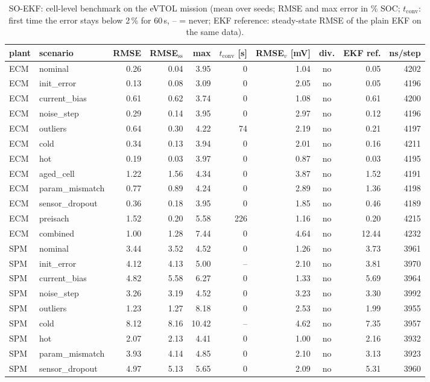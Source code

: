 \begin{table}[H]\centering\footnotesize\setlength{\tabcolsep}{4pt}
\caption{SO-EKF: cell-level benchmark on the eVTOL mission (mean over seeds; RMSE and max error in \% SOC; $t_\mathrm{conv}$: first time the error stays below 2\,\% for 60\,s, -- = never; EKF reference: steady-state RMSE of the plain EKF on the same data).}\label{tab:cell_SOEKF}
\begin{tabular}{llrrrrrcrr}\toprule
plant & scenario & RMSE & RMSE$_\mathrm{ss}$ & max & $t_\mathrm{conv}$ [s] & RMSE$_v$ [mV] & div. & EKF ref. & ns/step \\ \midrule
ECM & nominal & 0.26 & 0.04 & 3.95 & 0 & 1.04 & no & 0.05 & 4202 \\
ECM & init\_error & 0.13 & 0.08 & 3.09 & 0 & 2.05 & no & 0.05 & 4196 \\
ECM & current\_bias & 0.61 & 0.62 & 3.74 & 0 & 1.08 & no & 0.61 & 4200 \\
ECM & noise\_step & 0.29 & 0.14 & 3.95 & 0 & 2.97 & no & 0.12 & 4196 \\
ECM & outliers & 0.64 & 0.30 & 4.22 & 74 & 2.19 & no & 0.21 & 4197 \\
ECM & cold & 0.34 & 0.13 & 3.94 & 0 & 2.01 & no & 0.16 & 4211 \\
ECM & hot & 0.19 & 0.03 & 3.97 & 0 & 0.87 & no & 0.03 & 4195 \\
ECM & aged\_cell & 1.22 & 1.56 & 4.34 & 0 & 3.87 & no & 1.52 & 4191 \\
ECM & param\_mismatch & 0.77 & 0.89 & 4.24 & 0 & 2.89 & no & 1.36 & 4198 \\
ECM & sensor\_dropout & 0.36 & 0.18 & 3.95 & 0 & 1.85 & no & 0.46 & 4189 \\
ECM & preisach & 1.52 & 0.20 & 5.58 & 226 & 1.16 & no & 0.20 & 4215 \\
ECM & combined & 1.00 & 1.28 & 7.44 & 0 & 4.64 & no & 12.44 & 4232 \\
\midrule
SPM & nominal & 3.44 & 3.52 & 4.52 & 0 & 1.26 & no & 3.73 & 3961 \\
SPM & init\_error & 4.12 & 4.13 & 5.00 & -- & 2.10 & no & 3.81 & 3970 \\
SPM & current\_bias & 4.82 & 5.58 & 6.27 & 0 & 1.33 & no & 5.69 & 3964 \\
SPM & noise\_step & 3.26 & 3.19 & 4.52 & 0 & 3.23 & no & 3.30 & 3992 \\
SPM & outliers & 1.23 & 1.27 & 8.18 & 0 & 2.53 & no & 1.99 & 3955 \\
SPM & cold & 8.12 & 8.16 & 10.42 & -- & 4.62 & no & 7.35 & 3957 \\
SPM & hot & 2.07 & 2.13 & 4.41 & 0 & 1.00 & no & 2.16 & 3932 \\
SPM & param\_mismatch & 3.93 & 4.14 & 4.85 & 0 & 2.10 & no & 3.13 & 3923 \\
SPM & sensor\_dropout & 4.97 & 5.13 & 5.65 & 0 & 2.09 & no & 5.31 & 3960 \\
\bottomrule\end{tabular}\end{table}
